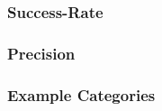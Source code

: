 \documentclass[\myrootdir/main.tex]{subfiles}
\begin{document}
\subsubsection{Success-Rate}
\subsubsection{Precision}
\subsubsection{Example Categories}





\end{document}
